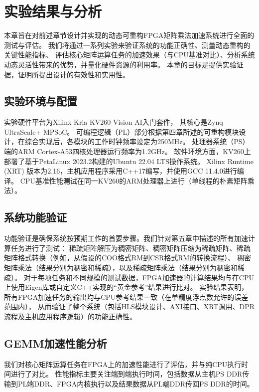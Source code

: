 \chapter{实验结果与分析}

本章旨在对前述章节设计并实现的动态可重构FPGA矩阵乘法加速系统进行全面的测试与评估。
我们将通过一系列实验来验证系统的功能正确性、测量动态重构的关键性能指标、
评估核心矩阵运算任务的加速效果（与CPU基准对比）、分析系统动态灵活性带来的优势，并量化硬件资源的利用率。
本章的目标是提供实验证据，证明所提出设计的有效性和实用性。

\section{实验环境与配置}

实验硬件平台为Xilinx Kria KV260 Vision AI入门套件，
其核心是Zynq UltraScale+ MPSoC。
可编程逻辑（PL）部分根据第四章所述的可重构模块设计，在综合实现后，各模块的工作时钟频率设定为250MHz。
处理器系统（PS）端的ARM Cortex-A53四核处理器运行频率为1.2GHz。
软件环境方面，KV260上部署了基于PetaLinux 2023.2构建的Ubuntu 22.04 LTS操作系统。
Xilinx Runtime (XRT) 版本为2.16，主机应用程序采用C++17编写，并使用GCC 11.4.0进行编译。
CPU基准性能测试在同一KV260的ARM处理器上进行（单线程的朴素矩阵乘法）。

\section{系统功能验证}

功能验证是确保系统按预期工作的首要步骤。我们针对第五章中描述的所有加速计算任务进行了测试：
稀疏矩阵解压为稠密矩阵、稠密矩阵压缩为稀疏矩阵、稀疏矩阵格式转换（例如，从假设的COO格式RM到CSR格式RM的转换流程）、
稠密矩阵乘法（结果分别为稠密和稀疏），以及稀疏矩阵乘法（结果分别为稠密和稀疏）。
对于每项任务和不同规模的测试数据，FPGA加速器的计算结果均与在CPU上使用Eigen库或自定义C++实现的“黄金参考”结果进行比对。
实验结果表明，所有FPGA加速任务的输出均与CPU参考结果一致（在单精度浮点数允许的误差范围内），
从而验证了整个系统（包括HLS模块设计、AXI接口、XRT调用、DPR流程及主机应用程序逻辑）的功能正确性。

\section{GEMM加速性能分析}

我们对核心矩阵运算任务在FPGA上的加速性能进行了评估，并与纯CPU执行时间进行了对比。
性能指标主要关注端到端执行时间，包括数据从主机PS DDR传输到PL端DDR、FPGA内核执行以及结果数据从PL端DDR传回PS DDR的时间。

